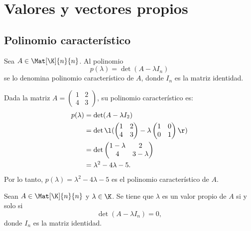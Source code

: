 \documentclass[compacto,10pt]{pubciencias-notas}
\begin{document}
\encabezado
\vspace*{-8mm}

\setcounter{section}{6}
\section{Valores y vectores propios}


\setcounter{subsection}{1}
\subsection{Polinomio caracter\'istico}


\begin{defi}
Sea $A\in \Mat[\K]{n}{n}$. Al polinomio
\[
    p(\lambda) = \det(A - \lambda I_{n})
\]
se lo denomina polinomio característico de $A$, donde $I_{n}$ es la matriz identidad.
\end{defi}

\begin{ejem}\hspace{0pt} Dada la matriz $A = \begin{pmatrix} 1&2\\4&3 \end{pmatrix}$, su polinomio característico es:
\begin{align*}
    p(\lambda)  &=  \det(A - \lambda I_{2})\\
                &=  \det\l(\begin{pmatrix}1&2\\4&3\end{pmatrix}-\lambda\begin{pmatrix}1&0\\0&1\end{pmatrix}\r)\\
                &=  \det\begin{pmatrix}1-\lambda &2 \\ 4 & 3-\lambda \end{pmatrix}\\
                &= \lambda^2 - 4\lambda - 5.\\
\end{align*}
Por lo tanto, $p(\lambda)= \lambda^2 - 4\lambda - 5$ es el polinomio característico de $A$.
\end{ejem}


\begin{prop}
Sean $A\in \Mat[\K]{n}{n}$ y $\lambda \in \K$. Se tiene que $\lambda$ es un valor propio de $A$ si y solo si
\[
    \det(A - \lambda I_{n}) = 0,
\]
donde $I_{n}$ es la matriz identidad.
\end{prop}
\end{document}
